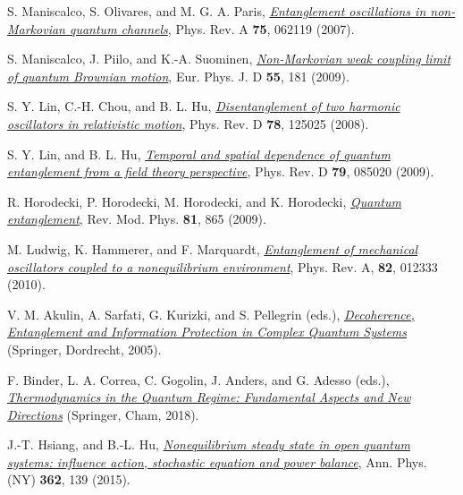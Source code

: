 \documentclass[11pt,a4paper]{article}
\begin{document}
\begin{thebibliography}{99}
    S. Maniscalco, S. Olivares, and M. G. A. Paris, \href{https://doi.org/10.1103/PhysRevA.75.062119}{\textit{Entanglement oscillations in non-Markovian quantum channels}}, Phys. Rev. A \textbf{75}, 062119 (2007). 
    
    S. Maniscalco, J. Piilo, and K.-A. Suominen, \href{https://doi.org/10.1140/epjd/e2009-00230-6}{\textit{Non-Markovian weak coupling limit of quantum Brownian motion}}, Eur. Phys. J. D \textbf{55}, 181 (2009).
 
    S. Y. Lin, C.-H. Chou, and B. L. Hu,  \href{https://doi.org/10.1103/PhysRevD.78.125025}{\textit{Disentanglement of two harmonic oscillators in relativistic motion}},  Phys. Rev. D \textbf{78}, 125025  (2008).


    S. Y. Lin, and B. L. Hu, \href{https://doi.org/10.1103/PhysRevD.79.085020}{\textit{Temporal and spatial dependence of quantum entanglement from a field theory perspective}}, Phys. Rev. D \textbf{79}, 085020 (2009).
    
    R. Horodecki, P. Horodecki, M. Horodecki, and K. Horodecki, \href{https://doi.org/10.1103/RevModPhys.81.865}{\textit{Quantum entanglement}}, Rev. Mod. Phys. \textbf{81}, 865 (2009).
    
    M. Ludwig, K. Hammerer, and F. Marquardt, \href{https://doi.org/10.1103/PhysRevA.82.012333}{\textit{Entanglement of mechanical oscillators coupled to a nonequilibrium environment}}, Phys. Rev. A, \textbf{82}, 012333 (2010).
    
    V. M. Akulin, A. Sarfati, G. Kurizki, and S. Pellegrin (eds.), \href{https://doi.org/10.1007/1-4020-3283-8}{\textsl{Decoherence, Entanglement and Information Protection in Complex Quantum Systems}} (Springer, Dordrecht, 2005).

    F. Binder, L. A. Correa, C. Gogolin, J. Anders, and G. Adesso (eds.), \href{https://doi.org/10.1007/978-3-319-99046-0}{\textsl{Thermodynamics in the Quantum Regime: Fundamental Aspects and New Directions}} (Springer, Cham, 2018).

    J.-T. Hsiang, and B.-L. Hu, \href{https://doi.org/10.1016/j.aop.2015.07.009}{\textit{Nonequilibrium steady state in open quantum systems: influence action, stochastic equation and power balance}}, Ann. Phys. (NY) \textbf{362}, 139 (2015).


\end{thebibliography}
\end{document}
